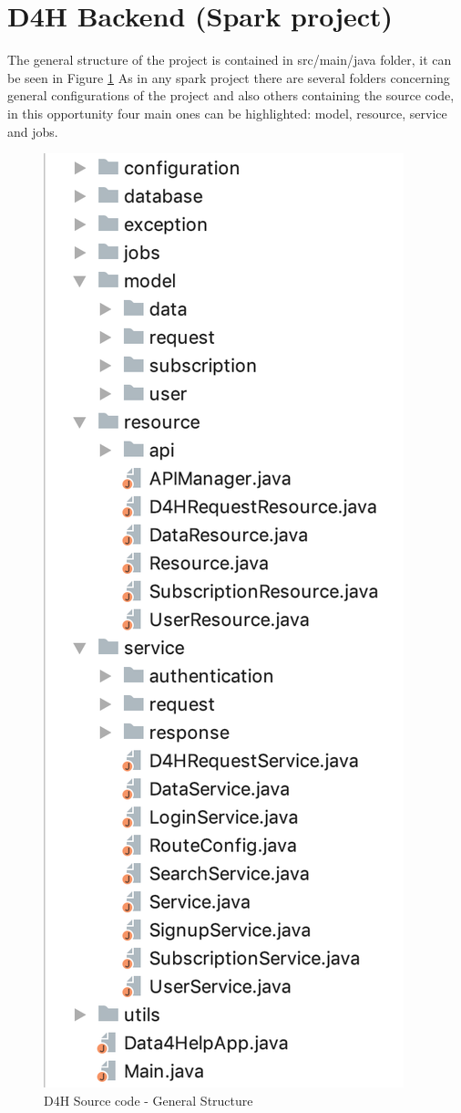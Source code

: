 \documentclass[a4paper, hidelinks, 12pt]{report}
\begin{document}
\section{D4H Backend (Spark project)}
	The general structure of the project is contained in src/main/java folder, it can be seen in Figure \ref{fig:d4h_source_code_structure} As in any spark project there are several folders concerning general configurations of the project and also others containing the source code, in this opportunity four main ones can be highlighted: model, resource, service and jobs.

	\begin{figure}[H]
		\centering
		\includegraphics[scale=0.5]{images/backend/d4h_source_code_structure.png}
		\caption[D4H Source code - General Structure]{D4H Source code - General Structure}
		\label{fig:d4h_source_code_structure}
	\end{figure}
\end{document}
